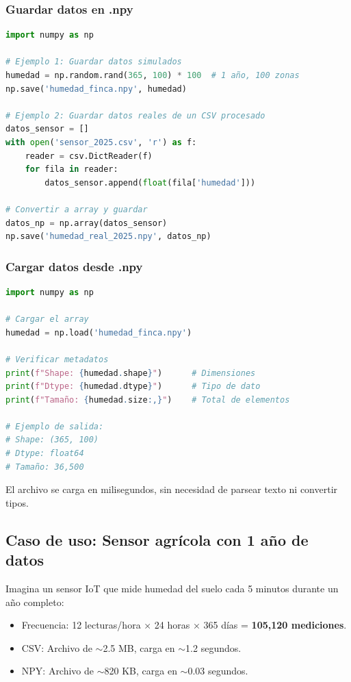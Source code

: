 \documentclass[11pt, a4paper]{article}
\begin{document}
\subsubsection{Guardar datos en .npy}

\begin{lstlisting}[language=Python, caption={Guardar datos de sensor en formato .npy}]
import numpy as np

# Ejemplo 1: Guardar datos simulados
humedad = np.random.rand(365, 100) * 100  # 1 año, 100 zonas
np.save('humedad_finca.npy', humedad)

# Ejemplo 2: Guardar datos reales de un CSV procesado
datos_sensor = []
with open('sensor_2025.csv', 'r') as f:
    reader = csv.DictReader(f)
    for fila in reader:
        datos_sensor.append(float(fila['humedad']))

# Convertir a array y guardar
datos_np = np.array(datos_sensor)
np.save('humedad_real_2025.npy', datos_np)
\end{lstlisting}

\subsubsection{Cargar datos desde .npy}

\begin{lstlisting}[language=Python, caption={Cargar y verificar datos guardados}]
import numpy as np

# Cargar el array
humedad = np.load('humedad_finca.npy')

# Verificar metadatos
print(f"Shape: {humedad.shape}")      # Dimensiones
print(f"Dtype: {humedad.dtype}")      # Tipo de dato
print(f"Tamaño: {humedad.size:,}")    # Total de elementos

# Ejemplo de salida:
# Shape: (365, 100)
# Dtype: float64
# Tamaño: 36,500
\end{lstlisting}

El archivo se carga en milisegundos, sin necesidad de parsear texto ni convertir tipos.

\subsection{Caso de uso: Sensor agrícola con 1 año de datos}

Imagina un sensor IoT que mide humedad del suelo cada 5 minutos durante un año completo:

\begin{itemize}
    \item Frecuencia: 12 lecturas/hora × 24 horas × 365 días = \textbf{105,120 mediciones}.
    \item CSV: Archivo de $\sim$2.5 MB, carga en $\sim$1.2 segundos.
    \item NPY: Archivo de $\sim$820 KB, carga en $\sim$0.03 segundos.
\end{itemize}
\end{document}
